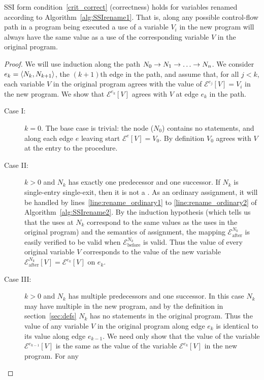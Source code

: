 \documentclass[12pt,titlepage,twoside]{article}
\begin{document}
\begin{lemma}\label{lem:correctness}
SSI form condition~\ref{crit_correct} (correctness) holds for
variables renamed according to Algorithm~\ref{alg:SSIrename1}.  That
is, along any possible control-flow path in a program being executed a
use of a variable $V_i$ in the new program will always have the same
value as a use of the corresponding variable $V$ in the original
program.
\end{lemma}
\begin{proof}
We will use induction along the path $N_0\rightarrow N_1\rightarrow\ldots\rightarrow N_n$.
We consider $e_k=\left\langle N_{k},N_{k+1} \right\rangle$, the $(k+1)$th edge in the path,
and assume that, for all $j<k$, each variable $V$ in the original
program agrees with the value of $\mathcal{E}^{e_j}[V]=V_i$ in the new
program.  We show that $\mathcal{E}^{e_k}[V]$ agrees with $V$ at edge
$e_k$ in the path.
\begin{description}
\item[Case I:] $k=0$. The base case is trivial: the  node
($N_0$) contains no statements, and along each edge $e$ leaving start
$\mathcal{E}^e[V]=V_0$.  By definition $V_0$ agrees with $V$ at the
entry to the procedure.
\item[Case II:] $k>0$ and $N_k$ has exactly one predecessor and one successor.
If $N_k$ is single-entry single-exit, then it is not a \phisigfunction[or].
As an ordinary assignment, it will be handled by
lines~\ref{line:rename_ordinary1} to \ref{line:rename_ordinary2} of
Algorithm~\vref{alg:SSIrename2}.  By the induction hypothesis (which
tells us that the uses at $N_k$ correspond to the same values as the
uses in the original program) and the semantics of
assignment, the mapping $\mathcal{E}_{\text{after}}^{N_k}$ is easily
verified to be valid when $\mathcal{E}_{\text{before}}^{N_k}$ is
valid.  Thus the value of every original variable $V$ corresponds to
the value of the new variable 
$\mathcal{E}_{\text{after}}^{N_k}[V]=\mathcal{E}^{e_k}[V]$ on $e_k$.
\item[Case III:] $k>0$ and $N_k$ has multiple predecessors and one
successor.  In this case $N_k$ may have multiple  in
the new program, and by the definition in section~\ref{sec:defs} $N_k$
has no statements in the original program.  Thus the value of any
variable $V$ in the original program along edge $e_k$ is identical to
its value along edge $e_{k-1}$.  We need only show that the value of
the variable $\mathcal{E}^{e_{k-1}}[V]$ is the same as the value of
the variable $\mathcal{E}^{e_k}[V]$ in the new program.  For any

\end{description}
\end{proof}
\end{document}
